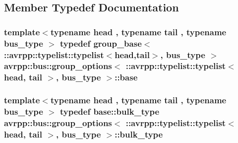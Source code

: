 \subsection{Member Typedef Documentation}
\hypertarget{structavrpp_1_1bus_1_1group__options_3_01_1_1avrpp_1_1typelist_1_1typelist_3_01head_00_01tail_01_4_00_01bus__type_01_4_a554c7dd8c5ba7b549a67054e05c60174}{
\subsubsection[{base}]{\setlength{\rightskip}{0pt plus 5cm}template$<$typename head , typename tail , typename bus\_\-type $>$ typedef group\_\-base$<$ ::{\bf avrpp::typelist::typelist}$<$head,tail$>$, bus\_\-type $>$ avrpp::bus::group\_\-options$<$ ::{\bf avrpp::typelist::typelist}$<$ head, tail $>$, bus\_\-type $>$::{\bf base}}}
\label{structavrpp_1_1bus_1_1group__options_3_01_1_1avrpp_1_1typelist_1_1typelist_3_01head_00_01tail_01_4_00_01bus__type_01_4_a554c7dd8c5ba7b549a67054e05c60174}
\hypertarget{structavrpp_1_1bus_1_1group__options_3_01_1_1avrpp_1_1typelist_1_1typelist_3_01head_00_01tail_01_4_00_01bus__type_01_4_a3606604692e3d11f3b7db4a71cc57fcf}{
\subsubsection[{bulk\_\-type}]{\setlength{\rightskip}{0pt plus 5cm}template$<$typename head , typename tail , typename bus\_\-type $>$ typedef base::bulk\_\-type avrpp::bus::group\_\-options$<$ ::{\bf avrpp::typelist::typelist}$<$ head, tail $>$, bus\_\-type $>$::{\bf bulk\_\-type}}}
\label{structavrpp_1_1bus_1_1group__options_3_01_1_1avrpp_1_1typelist_1_1typelist_3_01head_00_01tail_01_4_00_01bus__type_01_4_a3606604692e3d11f3b7db4a71cc57fcf}


